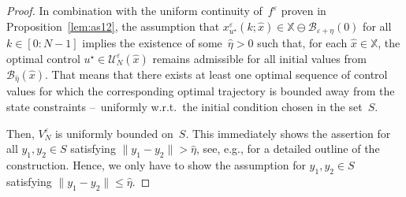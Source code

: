 \documentclass{article}
\numberwithin{equation}{section}
\newcommand{\bX}{\mathbb X}
\begin{document}
	\begin{proof}
		In combination with the uniform continuity of~$f^\varepsilon$ proven in Proposition~\ref{lem:as12}, the assumption that $x^\varepsilon_{u^\star}(k;\hat{x}) \in \bX \ominus \mathcal{B}_{\varepsilon + \eta}(0)$ for all $k\in [0:N-1]$ implies the existence of some~$\hat{\eta}>0$ such that, for each $\hat{x} \in \bX$, the optimal control $u^\star \in \mathcal{U}_N^\varepsilon(\hat{x})$ remains admissible for all initial values from $\mathcal{B}_{\hat{\eta}}(\hat{x})$. That means that there exists at least one optimal sequence of control values for which the corresponding optimal trajectory is bounded away from the state constraints --~uniformly w.r.t.\ the initial condition chosen in the set~$S$.
		
		Then, $V_N^\varepsilon$ is uniformly bounded on~$S$. This immediately shows the assertion for all $y_1, y_2 \in S$ satisfying $\| y_1 - y_2 \| > \hat{\eta}$, see, e.g., \cite{BoccGrun14} for a detailed outline of the construction. 
		Hence, we only have to show the assumption for $y_1,y_2 \in S$ satisfying $\| y_1 - y_2 \| \leq \hat{\eta}$.
		

\end{proof}
\end{document}
